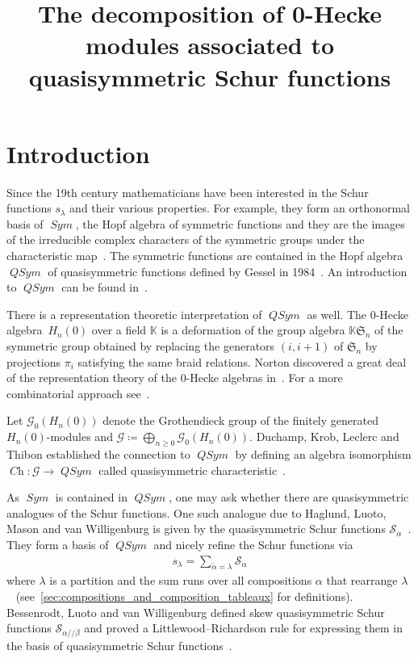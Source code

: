 \documentclass[ALCO,ThmDefs,Unicode,epreuves]{cedram}
\author{\firstname{Sebastian} \lastname{König}}
\title[The decomposition of 0-Hecke modules]{The decomposition of 0-Hecke modules associated to quasisymmetric Schur functions}
\newcommand{\mc}[1]{\mathcal{#1} }
\newcommand{\K}{\mathbb K}
\newcommand{\Sym}{\operatorname{\mathit{Sym}}}
\newcommand{\QSym}{\operatorname{\mathit{QSym}}}
\newcommand{\Ch}{\operatorname{\mathit{Ch}}}
\newcommand{\fS}{\mathfrak{S}}
\newcommand{\He}{H_n(0)}
\newcommand{\ab}{{\alpha / \! \! / \beta}}
\begin{document}
	
\maketitle





\section{Introduction}

Since the 19th century mathematicians have been interested in the Schur functions $s_\lambda$ and their various properties. For example, they form an orthonormal basis of $\Sym$, the Hopf algebra of symmetric functions and they are the images of the irreducible complex characters of the symmetric groups under the characteristic map~\cite{Stanley1999}. 
The symmetric functions are contained in the Hopf algebra $\QSym$ of quasisymmetric functions defined by Gessel in 1984~\cite{Gessel1984}. 
An introduction to $\QSym$ can be found in~\cite{Grinberg2014}.

There is a representation theoretic interpretation of $\QSym$ as well.
The 0-Hecke algebra~$\He$ over a field $\K$ is a deformation of the group algebra $\K\fS_n$ of the symmetric group obtained by replacing the generators $(i,i+1)$ of $\fS_n$ by projections $\pi_i$ satisfying the same braid relations. 
Norton discovered a great deal of the representation theory of the 0-Hecke algebras in~\cite{Norton1979}. For a more combinatorial approach see~\cite{Huang2016}.


Let $\mc G_0\left( \He \right)$ denote the Grothendieck group of the finitely generated $H_n(0)$-modules and $\mc G\coloneqq \bigoplus_{n \geq 0}\mc G_0\left( \He \right)$. 
Duchamp, Krob, Leclerc and Thibon established the connection to $\QSym$ by defining an algebra isomorphism $\Ch\colon \mc G \to \QSym$ called quasisymmetric characteristic~\cite{Duchamp1996, Krob1997}. 

As $\Sym$ is contained in $\QSym$, one may ask whether there are quasisymmetric analogues of the Schur functions.
One such analogue due to Haglund, Luoto, Mason and van Willigenburg is given by the quasisymmetric Schur functions $\mc S_\alpha$~\cite{Haglund2011}. They form a basis of $\QSym$ and nicely refine the Schur functions via
\begin{align*}
s_\lambda = \sum_{\widetilde \alpha = \lambda} \mc S_\alpha
\end{align*}
where $\lambda$ is a partition and the sum runs over all compositions $\alpha$ that rearrange $\lambda$~\cite{Haglund2011} (see~\cref{sec:compositions_and_composition_tableaux} for definitions).
Bessenrodt, Luoto and van Willigenburg defined skew quasisymmetric Schur functions $\mc S_\ab$ and proved a Littlewood--Richardson rule for expressing them in the basis of quasisymmetric Schur functions~\cite{Bessenrodt2011}.
\end{document}
